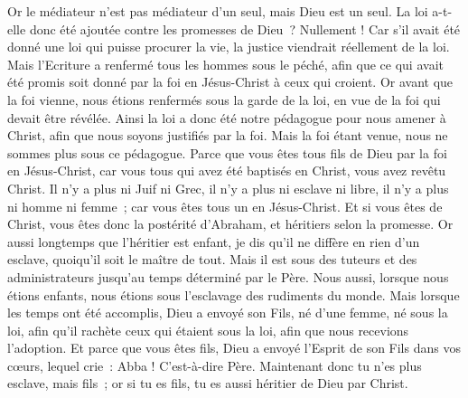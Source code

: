 \begin{multicols}{2}
Or le médiateur n'est pas médiateur d'un seul, mais Dieu est un seul.
La loi a-t-elle donc été ajoutée contre les promesses de Dieu~? Nullement ! Car s'il avait été donné une loi qui puisse procurer la vie, la justice viendrait réellement de la loi.
Mais l'Ecriture a renfermé tous les hommes sous le péché, afin que ce qui avait été promis soit donné par la foi en Jésus-Christ à ceux qui croient.
Or avant que la foi vienne, nous étions renfermés sous la garde de la loi, en vue de la foi qui devait être révélée.
Ainsi la loi a donc été notre pédagogue pour nous amener à Christ, afin que nous soyons justifiés par la foi.
Mais la foi étant venue, nous ne sommes plus sous ce pédagogue.
Parce que vous êtes tous fils de Dieu par la foi en Jésus-Christ,
car vous tous qui avez été baptisés en Christ, vous avez revêtu Christ.
Il n'y a plus ni Juif ni Grec, il n'y a plus ni esclave ni libre, il n'y a plus ni homme ni femme~; car vous êtes tous un en Jésus-Christ.
Et si vous êtes de Christ, vous êtes donc la postérité d'Abraham, et héritiers selon la promesse.
\VerseOne{}Or aussi longtemps que l'héritier est enfant, je dis qu'il ne diffère en rien d'un esclave, quoiqu'il soit le maître de tout.
Mais il est sous des tuteurs et des administrateurs jusqu'au temps déterminé par le Père.
Nous aussi, lorsque nous étions enfants, nous étions sous l'esclavage des rudiments du monde.
Mais lorsque les temps ont été accomplis, Dieu a envoyé son Fils, né d'une femme, né sous la loi,
afin qu'il rachète ceux qui étaient sous la loi, afin que nous recevions l'adoption.
Et parce que vous êtes fils, Dieu a envoyé l'Esprit de son Fils dans vos cœurs, lequel crie~: Abba ! C'est-à-dire Père.
Maintenant donc tu n'es plus esclave, mais fils~; or si tu es fils, tu es aussi héritier de Dieu par Christ.

\end{multicols}
